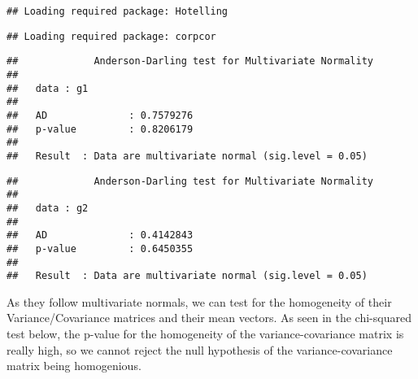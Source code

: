 \documentclass[]{article}
\newenvironment{Shaded}{\begin{snugshade}}{\end{snugshade}}
\newcommand{\KeywordTok}[1]{\textcolor[rgb]{0.13,0.29,0.53}{\textbf{#1}}}
\newcommand{\DataTypeTok}[1]{\textcolor[rgb]{0.13,0.29,0.53}{#1}}
\newcommand{\DecValTok}[1]{\textcolor[rgb]{0.00,0.00,0.81}{#1}}
\newcommand{\CommentTok}[1]{\textcolor[rgb]{0.56,0.35,0.01}{\textit{#1}}}
\newcommand{\OtherTok}[1]{\textcolor[rgb]{0.56,0.35,0.01}{#1}}
\newcommand{\OperatorTok}[1]{\textcolor[rgb]{0.81,0.36,0.00}{\textbf{#1}}}
\newcommand{\NormalTok}[1]{#1}
\begin{document}
\begin{verbatim}
## Loading required package: Hotelling
\end{verbatim}

\begin{verbatim}
## Loading required package: corpcor
\end{verbatim}

\begin{Shaded}
\end{Shaded}

\begin{verbatim}
##             Anderson-Darling test for Multivariate Normality 
## 
##   data : g1 
## 
##   AD              : 0.7579276 
##   p-value         : 0.8206179 
## 
##   Result  : Data are multivariate normal (sig.level = 0.05)
\end{verbatim}

\begin{Shaded}
\end{Shaded}

\begin{verbatim}
##             Anderson-Darling test for Multivariate Normality 
## 
##   data : g2 
## 
##   AD              : 0.4142843 
##   p-value         : 0.6450355 
## 
##   Result  : Data are multivariate normal (sig.level = 0.05)
\end{verbatim}

As they follow multivariate normals, we can test for the homogeneity of
their Variance/Covariance matrices and their mean vectors. As seen in
the chi-squared test below, the p-value for the homogeneity of the
variance-covariance matrix is really high, so we cannot reject the null
hypothesis of the variance-covariance matrix being homogenious.
\end{document}
